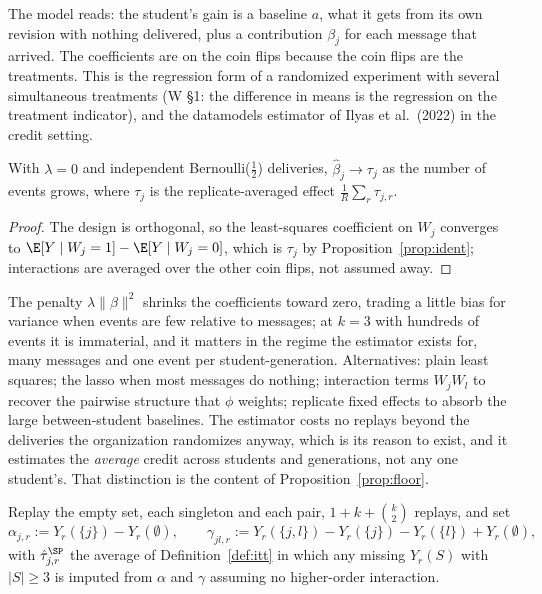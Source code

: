 \documentclass[11pt]{article}
\numberwithin{theorem}{section}
\theoremstyle{definition}
\theoremstyle{problemstyle}
\begin{document}
The model reads: the student's gain is a baseline $a$, what it gets from its own revision with nothing delivered, plus
a contribution $\beta_j$ for each message that arrived. The coefficients are on the coin flips because the coin flips
are the treatments. This is the regression form of a randomized experiment with several simultaneous treatments
(W \S1: the difference in means is the regression on the treatment indicator), and the datamodels estimator of Ilyas
et al.\ (2022) in the credit setting.

\begin{prop}
With $\lambda=0$ and independent Bernoulli($\tfrac12$) deliveries, $\hat\beta_j\to\tau_j$ as the number of events
grows, where $\tau_j$ is the replicate-averaged effect $\frac1R\sum_r\tau_{j,r}$.
\end{prop}
\begin{proof}
The design is orthogonal, so the least-squares coefficient on $W_j$ converges to $\E[Y\mid W_j=1]-\E[Y\mid W_j=0]$,
which is $\tau_j$ by Proposition~\ref{prop:ident}; interactions are averaged over the other coin flips, not assumed
away.
\end{proof}

\begin{remark}
The penalty $\lambda\|\beta\|^2$ shrinks the coefficients toward zero, trading a little bias for variance when events
are few relative to messages; at $k=3$ with hundreds of events it is immaterial, and it matters in the regime the
estimator exists for, many messages and one event per student-generation. Alternatives: plain least squares; the lasso
when most messages do nothing; interaction terms $W_jW_l$ to recover the pairwise structure that $\phi$ weights;
replicate fixed effects to absorb the large between-student baselines. The estimator costs no replays beyond the
deliveries the organization randomizes anyway, which is its reason to exist, and it estimates the \emph{average}
credit across students and generations, not any one student's. That distinction is the content of
Proposition~\ref{prop:floor}.
\end{remark}

\begin{definition}
Replay the empty set, each singleton and each pair, $1+k+\binom k2$ replays, and set
\[
\alpha_{j,r} := Y_r(\{j\})-Y_r(\emptyset),\qquad
\gamma_{jl,r} := Y_r(\{j,l\})-Y_r(\{j\})-Y_r(\{l\})+Y_r(\emptyset),
\]
with $\hat\tau^{\SP}_{j,r}$ the average of Definition~\ref{def:itt} in which any missing $Y_r(S)$ with $|S|\ge3$ is
imputed from $\alpha$ and $\gamma$ assuming no higher-order interaction.
\end{definition}
\end{document}
